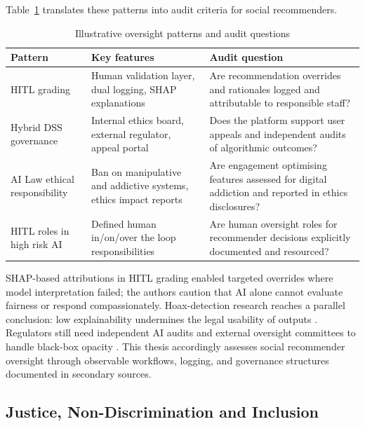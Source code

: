 \documentclass[11pt]{article}
\begin{document}
Table~\ref{tab:oversight_patterns} translates these patterns into audit criteria for social recommenders. \begin{table}[H] \centering \caption{Illustrative oversight patterns and audit questions} \label{tab:oversight_patterns} \begin{tabular}{p{3.5cm}p{4.5cm}p{4.5cm}} \hline Pattern & Key features & Audit question \\ \hline HITL grading \parencites[16]{6805789} & Human validation layer, dual logging, SHAP explanations & Are recommendation overrides and rationales logged and attributable to responsible staff? \\ Hybrid DSS governance \parencites[2]{0375818} & Internal ethics board, external regulator, appeal portal & Does the platform support user appeals and independent audits of algorithmic outcomes? \\ AI Law ethical responsibility \parencites[61--62]{2977039} & Ban on manipulative and addictive systems, ethics impact reports & Are engagement optimising features assessed for digital addiction and reported in ethics disclosures? \\ HITL roles in high risk AI \parencites[5]{6794105}[7]{7461574} & Defined human in/on/over the loop responsibilities & Are human oversight roles for recommender decisions explicitly documented and resourced? \\ \hline \end{tabular} \end{table}

SHAP-based attributions in HITL grading \parencites[16]{6805789}[21]{6805789} enabled targeted overrides where model interpretation failed; the authors caution that AI alone cannot evaluate fairness or respond compassionately. Hoax-detection research reaches a parallel conclusion: low explainability undermines the legal usability of outputs \parencites[3]{9366495}. Regulators still need independent AI audits and external oversight committees to handle black-box opacity \parencites[9]{7461574}. This thesis accordingly assesses social recommender oversight through observable workflows, logging, and governance structures documented in secondary sources.

\subsection{Justice, Non-Discrimination and Inclusion}
\end{document}
